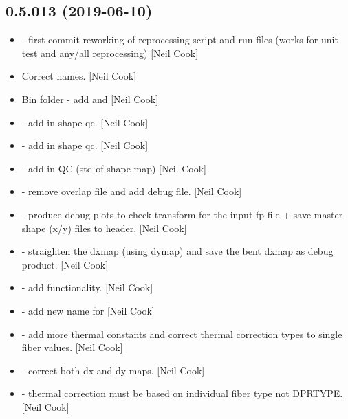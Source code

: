 \documentclass[a4paper,10pt,english]{report}
\begin{document}
\subsection{0.5.013 (2019-06-10)}
\label{\detokenize{misc/changelog:id123}}\begin{itemize}
\item {} 
 - first commit reworking of reprocessing script and
run files (works for unit test and any/all reprocessing) {[}Neil Cook{]}

\item {} 
Correct names. {[}Neil Cook{]}

\item {} 
Bin folder - add  and  {[}Neil Cook{]}

\item {} 
 - add in shape qc. {[}Neil Cook{]}

\item {} 
 - add in shape qc. {[}Neil Cook{]}

\item {} 
 - add in QC (std of shape map) {[}Neil Cook{]}

\item {} 
 - remove overlap file and add 
debug file. {[}Neil Cook{]}

\item {} 
 - produce debug plots to check transform for the
input fp file + save master shape (x/y) files to header. {[}Neil Cook{]}

\item {} 
 - straighten the dxmap (using dymap) and
save the bent dxmap as debug product. {[}Neil Cook{]}

\item {} 
 - add  functionality. {[}Neil Cook{]}

\item {} 
 - add new name for 
 {[}Neil Cook{]}

\item {} 
 - add more thermal constants and correct
thermal correction types to single fiber values. {[}Neil Cook{]}

\item {} 
 - correct both dx and dy maps. {[}Neil Cook{]}

\item {} 
 - thermal correction must be based on
individual fiber type not DPRTYPE. {[}Neil Cook{]}

\end{itemize}
\end{document}
